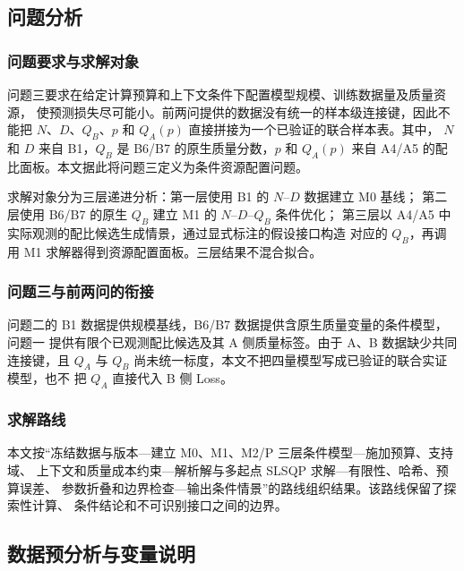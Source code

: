 
\subsection{问题分析}
\label{sec:q3-analysis}

\subsubsection{问题要求与求解对象}

问题三要求在给定计算预算和上下文条件下配置模型规模、训练数据量及质量资源，
使预测损失尽可能小。前两问提供的数据没有统一的样本级连接键，因此不能把
$N$、$D$、$Q_B$、$p$ 和 $Q_A(p)$ 直接拼接为一个已验证的联合样本表。其中，
$N$ 和 $D$ 来自 B1，$Q_B$ 是 B6/B7 的原生质量分数，$p$ 和 $Q_A(p)$ 来自
A4/A5 的配比面板。本文据此将问题三定义为条件资源配置问题。

求解对象分为三层递进分析：第一层使用 B1 的 $N$--$D$ 数据建立 M0 基线；
第二层使用 B6/B7 的原生 $Q_B$ 建立 M1 的 $N$--$D$--$Q_B$ 条件优化；
第三层以 A4/A5 中实际观测的配比候选生成情景，通过显式标注的假设接口构造
对应的 $Q_B$，再调用 M1 求解器得到资源配置面板。三层结果不混合拟合。

\subsubsection{问题三与前两问的衔接}

问题二的 B1 数据提供规模基线，B6/B7 数据提供含原生质量变量的条件模型，问题一
提供有限个已观测配比候选及其 A 侧质量标签。由于 A、B 数据缺少共同连接键，且
$Q_A$ 与 $Q_B$ 尚未统一标度，本文不把四量模型写成已验证的联合实证模型，也不
把 $Q_A$ 直接代入 B 侧 Loss。

\subsubsection{求解路线}

本文按“冻结数据与版本—建立 M0、M1、M2/P 三层条件模型—施加预算、支持域、
上下文和质量成本约束—解析解与多起点 SLSQP 求解—有限性、哈希、预算误差、
参数折叠和边界检查—输出条件情景”的路线组织结果。该路线保留了探索性计算、
条件结论和不可识别接口之间的边界。

\subsection{数据预分析与变量说明}
\label{sec:q3-data}

